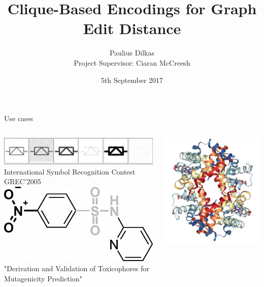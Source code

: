 \documentclass{beamer}
\author{Paulius Dilkas\\{\small Project Supervisor: Ciaran McCreesh}}
\title{Clique-Based Encodings for Graph Edit Distance}
\date{5th September 2017}
\institute{School of Computing Science}
\begin{document}
\maketitle
\begin{frame}{Use cases}
  \begin{columns}[t]
    \begin{column}{0.5\textwidth}
      \centering
      \includegraphics[width=\textwidth]{grec.jpg} \\
      {\tiny\color{gray}International Symbol Recognition Contest GREC'2005} \\
      \vspace{1.15cm}
      \includegraphics[width=\textwidth]{muta.png} \\
      {\tiny\color{gray}"Derivation and Validation of Toxicophores for\\[-7pt] Mutagenicity Prediction"}
    \end{column}
    \begin{column}{0.5\textwidth}
      \centering
      \includegraphics[height=0.3\textheight]{protein.jpg} \\

\end{column}
\end{columns}
\end{frame}
\end{document}
